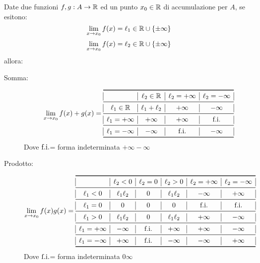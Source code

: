 \begin{teo}
Date due funzioni $f,g:A\rightarrow\mathbb{R}$ ed un punto $x_0\in\mathbb{R}$ di accumulazione per $A$, se esitono:
\[\lim_{x\to x_0}{f(x)}=\ell_1\in\mathbb{R}\cup\{\pm\infty\}\]
\[\lim_{x\to x_0}{f(x)}=\ell_2\in\mathbb{R}\cup\{\pm\infty\}\]
allora:
\begin{description}
\item[Somma:]
\[\lim_{x\to x_0}{f(x)+g(x)}= 
\begin{array}{ |*{4}{c|} }
\toprule
& \ell_2 \in \R & \ell_2 = +\infty & \ell_2 = -\infty \\
\midrule
\ell_1 \in \R & \ell_1 + \ell_2 & +\infty & -\infty \\
\midrule
\ell_1 = +\infty & +\infty & +\infty & \foi \\
\midrule
\ell_1 = -\infty & -\infty & \foi & -\infty \\
\bottomrule
\end{array}\]
Dove $\text{f.i.}$= forma indeterminata $+\infty -\infty$

\item[Prodotto:]
\[\lim_{x\to x_0}{f(x)g(x)}= 
\begin{array}{ |*{6}{c|} }
\toprule
& \ell_2<0 & \ell_2=0 & \ell_2>0 & \ell_2=+\infty & \ell_2=-\infty\\
\midrule
\ell_1<0 & \ell_1 \ell_2 & 0 & \ell_1 \ell_2 & -\infty & +\infty \\
\midrule
\ell_1=0 & 0 & 0 & 0 & \foi & \foi \\
\midrule
\ell_1>0 & \ell_1 \ell_2 & 0 & \ell_1 \ell_2 & +\infty & -\infty \\
\midrule
\ell_1=+\infty & -\infty & \foi & +\infty & +\infty & -\infty \\
\midrule
\ell_1=-\infty & +\infty & \foi & -\infty & -\infty & +\infty\\
\bottomrule
\end{array}\]
Dove $\text{f.i.}$= forma indeterminata $0 \infty$


\end{description}
\end{teo}
